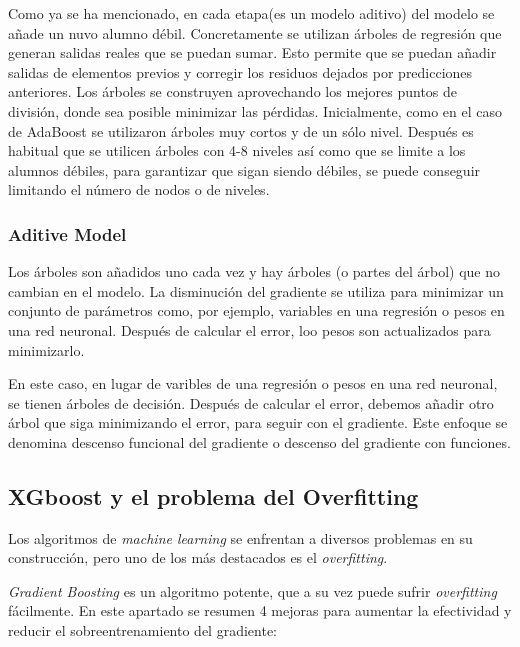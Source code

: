 Como ya se ha mencionado, en cada etapa(es un modelo aditivo) del modelo se añade un nuvo alumno débil. Concretamente se utilizan árboles de regresión que generan salidas reales que se puedan sumar. Esto permite que se puedan añadir salidas de elementos previos y corregir los residuos dejados por predicciones anteriores. Los árboles se construyen aprovechando los mejores puntos de división, donde sea posible minimizar las pérdidas.
Inicialmente, como en el caso de AdaBoost se utilizaron árboles muy cortos y de un sólo nivel. Después es habitual que se utilicen árboles con 4-8 niveles así como que se limite a los alumnos débiles, para garantizar  que sigan siendo débiles, se puede conseguir limitando el número de nodos o de niveles.\cite{XGBoost}

\subsubsection{Aditive Model}

Los árboles son añadidos uno cada vez y hay árboles (o partes del árbol) que no cambian en el modelo. La disminución del gradiente se utiliza para minimizar un conjunto de parámetros como, por ejemplo, variables en una regresión o pesos en una red neuronal. Después de calcular el error, loo pesos son actualizados para minimizarlo.\cite{XGBoost}\par 

En este caso, en lugar de varibles de una regresión o pesos en una red neuronal, se tienen árboles de decisión. Después de calcular el error, debemos añadir otro árbol que siga minimizando el error, para seguir con el gradiente. Este enfoque se denomina descenso funcional del gradiente o descenso del gradiente con funciones.

\subsection{XGboost y el problema del Overfitting}

Los algoritmos de \textit{machine learning} se enfrentan a diversos problemas en su construcción, pero uno de los más destacados es el \textit{overfitting}.\par 

\textit{Gradient Boosting} es un algoritmo potente, que a su vez puede sufrir \textit{overfitting} fácilmente. En este apartado se resumen 4 mejoras para aumentar la efectividad  y reducir el sobreentrenamiento del gradiente:

